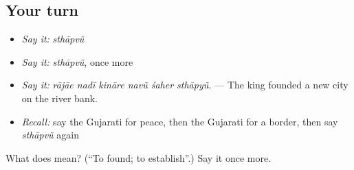 \subsection*{Your turn}
\begin{itemize}
\raggedright
  \item \emph{Say it:} \emph{sthāpvũ}
  \item \emph{Say it:} \emph{sthāpvũ}, once more
  \item \emph{Say it:} \emph{rājāe nadī kināre navũ śaher sthāpyũ.} — The king founded a new city on the river bank.
  \item \emph{Recall:} say the Gujarati for peace, then the Gujarati for a border, then say \emph{sthāpvũ} again
\end{itemize}

\begin{tcolorbox}[breakable,colback=teal!4,colframe=teal!35!black,title={Before you move on}]
What does  mean? (\textquotedblleft{}To found; to establish\textquotedblright{}.) Say it once more.
\end{tcolorbox}
